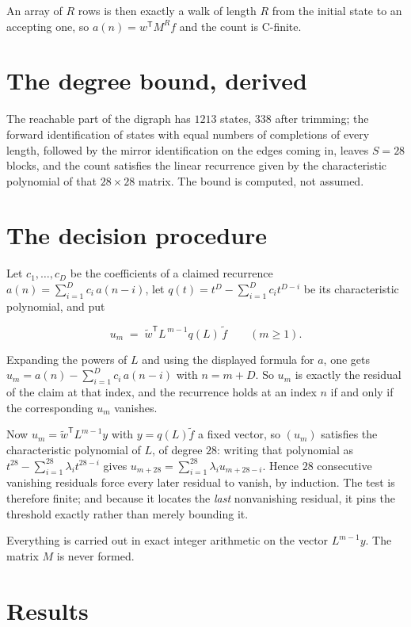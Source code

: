 \documentclass[11pt]{article}
\theoremstyle{definition}
\begin{document}
An array of $R$ rows is then exactly a walk of length $R$ from the initial state to an accepting one, so $a(n) = w^{\mathsf T}M^{R}f$ and the count is C-finite.

\section{The degree bound, derived}

The reachable part of the digraph has $1213$ states, $338$ after trimming; the forward identification of states with equal numbers of completions of every length, followed by the mirror identification on the edges coming in, leaves $S = 28$ blocks, and the count satisfies the linear recurrence given by the characteristic polynomial of that $28\times28$ matrix. The bound is computed, not assumed.

\section{The decision procedure}

Let $c_1,\dots,c_D$ be the coefficients of a claimed recurrence $a(n) = \sum_{i=1}^{D} c_i\,a(n-i)$, let $q(t) = t^{D} - \sum_{i=1}^{D} c_i t^{D-i}$ be its characteristic polynomial, and put

\[u_m \;=\; \tilde w^{\mathsf T} L^{\,m-1} q(L)\,\tilde f \qquad (m \ge 1).\]

Expanding the powers of $L$ and using the displayed formula for $a$, one gets $u_m = a(n) - \sum_{i=1}^{D} c_i\,a(n-i)$ with $n = m + D$. So $u_m$ is exactly the residual of the claim at that index, and the recurrence holds at an index $n$ if and only if the corresponding $u_m$ vanishes.

Now $u_m = \tilde w^{\mathsf T} L^{m-1} y$ with $y = q(L)\tilde f$ a fixed vector, so $(u_m)$ satisfies the characteristic polynomial of $L$, of degree $28$: writing that polynomial as $t^{28} - \sum_{i=1}^{28} \lambda_i t^{28-i}$ gives $u_{m+28} = \sum_{i=1}^{28} \lambda_i u_{m+28-i}$. Hence $28$ consecutive vanishing residuals force every later residual to vanish, by induction. The test is therefore finite; and because it locates the {\itshape last} nonvanishing residual, it pins the threshold exactly rather than merely bounding it.

Everything is carried out in exact integer arithmetic on the vector $L^{m-1}y$. The matrix $M$ is never formed.

\section{Results}
\end{document}
